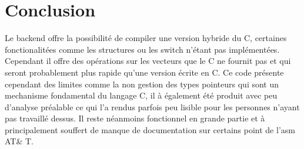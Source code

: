 \section{Conclusion}

Le backend offre la possibilité de compiler une version hybride du C, certaines fonctionalitées comme les structures ou les switch n'étant pas implémentées. Cependant il offre des opérations sur les vecteurs que le C ne fournit pas et qui seront probablement plus rapide qu'une version écrite en C. Ce code présente cependant des limites comme la non gestion des types pointeurs qui sont un mechanisme fondamental du langage C, il à également été produit avec peu d'analyse préalable ce qui l'a rendus parfois peu lisible pour les personnes n'ayant pas travaillé dessus. Il reste néanmoins fonctionnel en grande partie et à principalement souffert de manque de documentation sur certains point de l'asm AT\& T. 